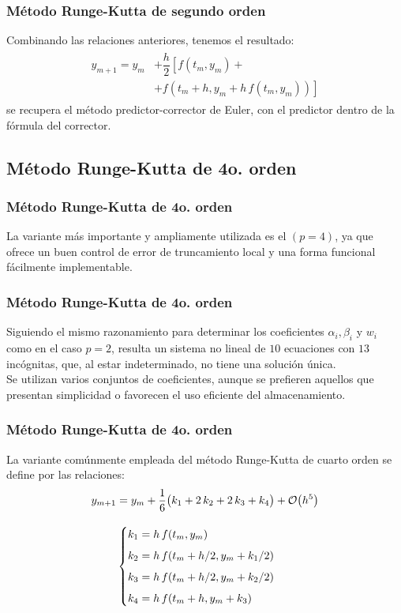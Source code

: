 \begin{frame}
\frametitle{Método Runge-Kutta de segundo orden}
Combinando las relaciones anteriores, tenemos el resultado:
\begin{align}
\begin{aligned}
y_{m+1} = y_{m} &+ \dfrac{h}{2} \left[ f(t_{m}, y_{m}) + \right. \\ 
&\left. + f(t_{m} + h, y_{m} + h \, f(t_{m}, y_{m})) \right] 
\end{aligned}
\label{eq:ecuacion_12_33}
\end{align}
se recupera el método predictor-corrector de Euler, con el predictor dentro de la fórmula del corrector.
\end{frame}
\subsection{Método Runge-Kutta de 4o. orden}
\begin{frame}
\frametitle{Método Runge-Kutta de 4o. orden}
La variante más importante y ampliamente utilizada es el  $(p = 4)$, ya que ofrece un buen control de error de truncamiento local y una forma funcional fácilmente implementable.
\end{frame}
\begin{frame}
\frametitle{Método Runge-Kutta de 4o. orden}
Siguiendo el mismo razonamiento para determinar los coeficientes $\alpha_{i}, \beta_{i}$ y $w_{i}$ como en el caso $p = 2$, resulta un sistema no lineal de $10$ ecuaciones con $13$ incógnitas, que, al estar indeterminado, no tiene una solución única.
\\
\bigskip
Se utilizan varios conjuntos de coeficientes, aunque se prefieren aquellos que presentan simplicidad o favorecen el uso eficiente del almacenamiento.
\end{frame}
\begin{frame}
\frametitle{Método Runge-Kutta de 4o. orden}
La variante comúnmente empleada del método Runge-Kutta de cuarto orden se define por las relaciones:
\fontsize{12}{12}\selectfont
\begin{align}
y_{m+1} &= y_{m} + \dfrac{1}{6} \big( k_{1} + 2 \, k_{2} + 2 \, k_{3} + k_{4} \big) + \order{h^{5}} \label{eq:ecuacion_12_34} \\[1em]
&\begin{cases}
k_{1} = h \, f(t_{m}, y_{m}) \\[0.5em]
k_{2} = h \, f(t_{m} + h/2, y_{m} + k_{1}/2) \\[0.5em]
k_{3} = h \, f(t_{m} + h/2, y_{m} + k_{2}/2) \\[0.5em]
k_{4} = h \, f(t_{m} + h, y_{m} + k_{3})
\end{cases} \label{eq:ecuacion_12_35}
\end{align}
\end{frame}
